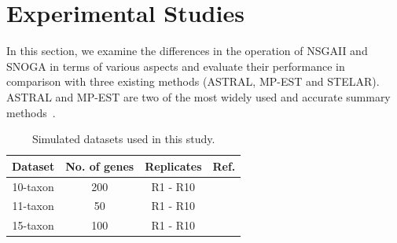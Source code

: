 \section{Experimental Studies}
\label{sec:snoga-experiment}
In this section, we examine the differences in the operation of NSGAII and SNOGA in terms of various aspects and evaluate their performance in comparison with three existing methods (ASTRAL, MP-EST and STELAR). ASTRAL and MP-EST are two of the most widely used and accurate summary methods~\cite{islam2019stelar}. 

\begin{table}[htbp]
	\centering
	\caption{Simulated datasets used in this study.}
	\begin{tabular}{|c|c|c|c|}
		\hline
		Dataset & \multicolumn{1}{l|}{No. of genes} & Replicates & \multicolumn{1}{l|}{Ref.} \\
		\hline
		10-taxon &   200    & R1 - R10 & \cite{bayzid2015weighted} \\
		\hline
		11-taxon &   50    & R1 - R10 & \cite{chung2011comparing} \\
		\hline
		15-taxon &   100    & R1 - R10 & \cite{statistical-binning} \\
		\hline
	\end{tabular}\label{tab:datasets}\end{table}

